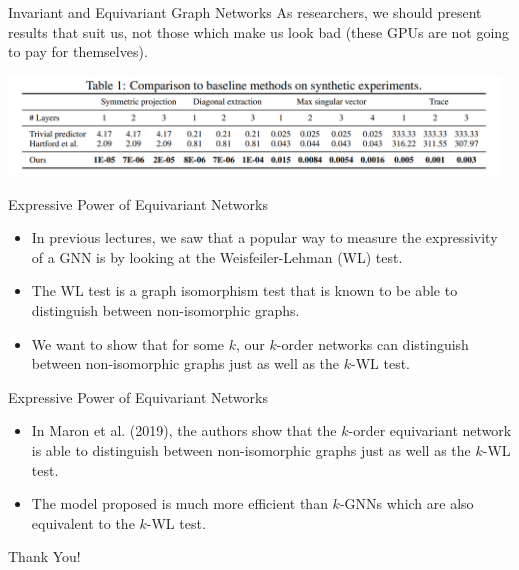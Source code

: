 \documentclass{beamer}
\begin{document}
\begin{frame}{Invariant and Equivariant Graph Networks}
    As researchers, we should present results that suit us, not those which make us look bad (these GPUs are not going to pay for themselves).
    \begin{center}
        \includegraphics[width=0.98\textwidth]{../figures/synth.png}
    \end{center}
\end{frame}
\begin{frame}{Expressive Power of Equivariant Networks}
    \begin{itemize}
        \item In previous lectures, we saw that a popular way to measure the expressivity of a GNN is by looking at the Weisfeiler-Lehman (WL) test.
        \pause
        \item The WL test is a graph isomorphism test that is known to be able to distinguish between non-isomorphic graphs.
        \item We want to show that for some $k$, our $k$-order networks can distinguish between non-isomorphic graphs just as well as the $k$-WL test.
    \end{itemize}
\end{frame}
\begin{frame}{Expressive Power of Equivariant Networks}
    \begin{itemize}
        \item In Maron et al. (2019), the authors show that the $k$-order equivariant network is able to distinguish between non-isomorphic graphs just as well as the $k$-WL test.
        \pause
        \item The model proposed is much more efficient than $k$-GNNs which are also equivalent to the $k$-WL test.
    \end{itemize}
\end{frame}
\begin{frame}[plain]
    \centering
    \Huge Thank You!
\end{frame}
\end{document}

